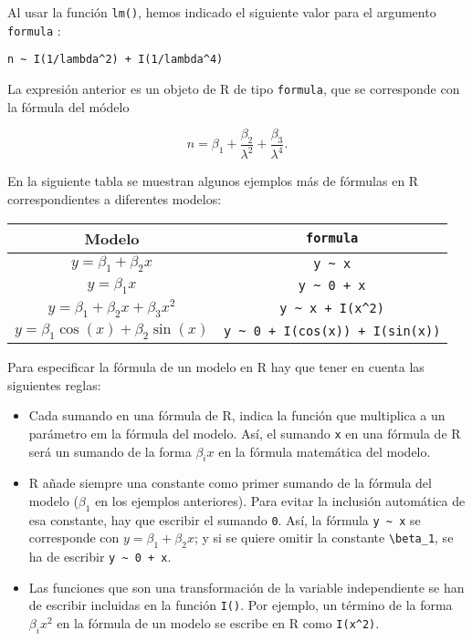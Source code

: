 \documentclass[
  degree=mecinf,
  title=normal,
  toc=normal,
  bib=normal]{mnye}
\begin{document}
Al usar la función \texttt{lm()}, hemos indicado el siguiente valor para el argumento \texttt{formula} :

\texttt{n\ \textasciitilde{}\ I(1/lambda\^{}2)\ +\ I(1/lambda\^{}4)}

La expresión anterior es un objeto de \textsf{R} de tipo \texttt{formula}, que se corresponde con la fórmula del módelo

\[n = \beta_1 + \frac{\beta_2}{\lambda^2} + \frac{\beta_3}{\lambda^4}.\]

En la siguiente tabla se muestran algunos ejemplos más de fórmulas en \textsf{R} correspondientes a diferentes modelos:

\begin{longtable}[]{@{}cc@{}}
\toprule
Modelo & \texttt{formula} \\
\midrule
\endhead
\(y=\beta_1+\beta_2x\) & \texttt{y\ \textasciitilde{}\ x} \\
\(y=\beta_1 x\) & \texttt{y\ \textasciitilde{}\ 0\ +\ x} \\
\(y=\beta_1 + \beta_2 x + \beta_3 x^2\) & \texttt{y\ \textasciitilde{}\ x\ +\ I(x\^{}2)} \\
\(y=\beta_1 \cos(x)+ \beta_2\sin(x)\) & \texttt{y\ \textasciitilde{}\ 0\ +\ I(cos(x))\ +\ I(sin(x))} \\
\bottomrule
\end{longtable}

Para especificar la fórmula de un modelo en \textsf{R} hay que tener en cuenta las siguientes reglas:

\begin{itemize}
\item
  Cada sumando en una fórmula de \textsf{R}, indica la función que multiplica a un parámetro em la fórmula del modelo. Así, el sumando \texttt{x} en una fórmula de \textsf{R} será un sumando de la forma \(\beta_ix\) en la fórmula matemática del modelo.
\item
  \textsf{R} añade siempre una constante como primer sumando de la fórmula del modelo (\(\beta_1\) en los ejemplos anteriores). Para evitar la inclusión automática de esa constante, hay que escribir el sumando \texttt{0}. Así, la fórmula \texttt{y\ \textasciitilde{}\ x} se corresponde con \(y = \beta_1 + \beta_2x\); y si se quiere omitir la constante \texttt{\textbackslash{}beta\_1}, se ha de escribir \texttt{y\ \textasciitilde{}\ 0\ +\ x}.
\item
  Las funciones que son una transformación de la variable independiente se han de escribir incluidas en la función \texttt{I()}. Por ejemplo, un término de la forma \(\beta_i x^2\) en la fórmula de un modelo se escribe en \textsf{R} como \texttt{I(x\^{}2)}.
\end{itemize}
\end{document}
